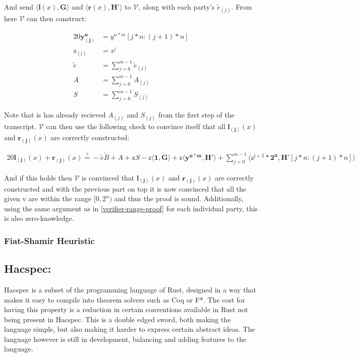 \documentclass{article}
\newcommand{\eq}[1]{\begin{alignat*}{20}#1\end{alignat*}}
\renewcommand{\vec}[1]{\boldsymbol{#1}}
\newcommand{\ran}[1]{\mathrm{#1}}
\newcommand{\vecran}[1]{\mathbf{#1}}
\newcommand{\V}{\mathcal{V}}
\newcommand{\dotp}[2]{\langle #1, #2 \rangle}
\begin{document}
And send $\dotp{\vec{l}(x)}{\vec{G}}$ and $\dotp{\vec{r}(x)}{\vec{H'}}$ to $\V$, along with each party's $\widetilde{e}_{(j)}$. From here $\V$ can then construct:

\eq{
	\vecran{y^n_{(j)}} &= y^{n*m}[j*n : (j+1)*n]\\
	\ran{z_{(j)}} &= z^j\\
	\widetilde{e} &= \sum^{m-1}_{j = 0} \widetilde{e}_{(j)}\\
	A &= \sum^{m-1}_{j = 0} A_{(j)}\\
	S &= \sum^{m-1}_{j = 0} S_{(j)}
}

Note that is has already recieved $A_{(j)}$ and $S_{(j)}$ from the first step of the transcript. $\V$ can then use the following check to convince itself that all $\vec{l_{(j)}}(x)$ and $\vec{r_{(j)}}(x)$ are correctly constructed:

\eq{
	\vec{l_{(j)}}(x) + \vec{r_{(j)}}(x) \stackrel{?}{=} -\widetilde{e}\widetilde{B} + A + \ran{x}S - \ran{z}\dotp{\vec{1}}{\vec{G}} + \ran{z}\dotp{\vecran{y^{n*m}}}{\vec{H'}} + \sum^{m-1}_{j = 0}\dotp{\ran{z^{j+2}}*\vec{2^n}}{\vec{H'}[j*n: (j+1)*n]}
}

And if this holds then $\V$ is convinced that $\vec{l_{(j)}}(x)$ and $\vec{r_{(j)}}(x)$ are correctly constructed and with the previous part on top it is now convinced that all the given v are within the range $[0,2^n)$ and thus the proof is sound. Additionally, using the same argument as in \ref{verifier-range-proof} for each individual party, this is also zero-knowledge.


\subsubsection{Fiat-Shamir Heuristic}\label{fiat-shamir-heuristic}

\subsection{Hacspec:} \label{Hacspec}

Hacspec is a subset of the programming language of Rust, designed in a
way that makes it easy to compile into theorem solvers such as Coq or F*.
The cost for having this property is a reduction in certain conventions
available in Rust not being present in Hacspec. This is a double edged
sword, both making the language simple, but also making it harder to
express certain abstract ideas. The language however is still in
development, balancing and adding features to the language.
\end{document}

